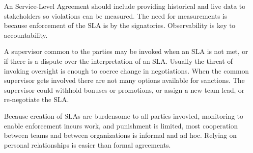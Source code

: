 An Service-Level Agreement should include providing historical and live data to stakeholders so violations can be measured. The need for measurements is because enforcement of the SLA is by the signatories. Observability is key to accountability. 

A supervisor common to the parties may be invoked when an SLA is not met, or if there is a dispute over the interpretation of an SLA. Usually the threat of invoking oversight is enough to coerce change in negotiations. 
When the common supervisor gets involved there are not many options available for sanctions. The supervisor could withhold bonuses or promotions, or assign a new team lead, or re-negotiate the SLA. 

Because creation of SLAs are burdensome to all parties invovled, monitoring to enable enforcement incurs work, and punishment is limited, most cooperation between teams and between organizations is informal and ad hoc. Relying on personal relationships is easier than formal agreements.

